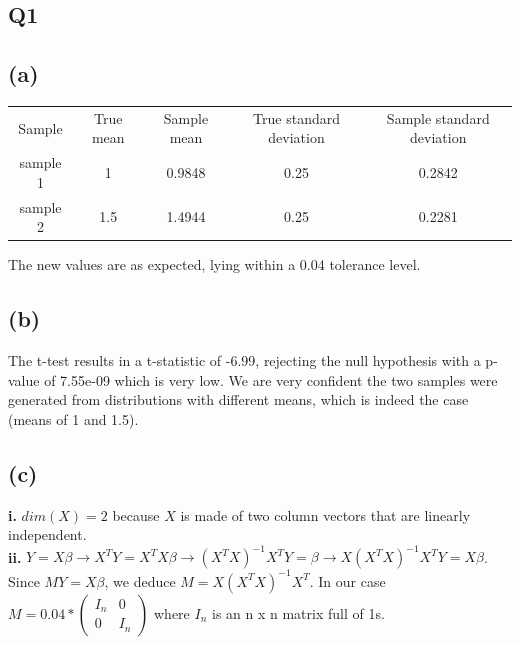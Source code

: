 \documentclass[12pt,a4paper,oneside]{report}
\begin{document}

\subsection*{Q1}
\subsection*{(a)}

\begin{center}
\begin{tabular}{c | c | c | c | c}
Sample & True mean & Sample mean & True standard deviation & Sample standard deviation\\
sample 1 & 1 & 0.9848 & 0.25 & 0.2842\\
sample 2 & 1.5 & 1.4944 & 0.25 & 0.2281\\
\end{tabular}
\end{center}

The new values are as expected, lying within a 0.04 tolerance level.

\subsection*{(b)}

The t-test results in a t-statistic of -6.99, rejecting the null hypothesis with a p-value of 7.55e-09 which is very low. We are very confident the two samples were generated from distributions with different means, which is indeed the case (means of 1 and 1.5).

\subsection*{(c)}

\textbf{i.} $dim(X) = 2$ because $X$ is made of two column vectors that are linearly independent.\\

\textbf{ii.} $Y = X\beta \to X^TY = X^TX\beta \to (X^TX)^{-1}X^TY = \beta \to X(X^TX)^{-1}X^TY = X\beta$. Since $MY = X\beta$, we deduce $M = X(X^TX)^{-1}X^T$. In our case $M = 
0.04 * \begin{pmatrix}
I_n & 0\\
0 & I_n
\end{pmatrix}
$
where $I_n$ is an n x n matrix full of 1s.\\
                 
\end{document}
